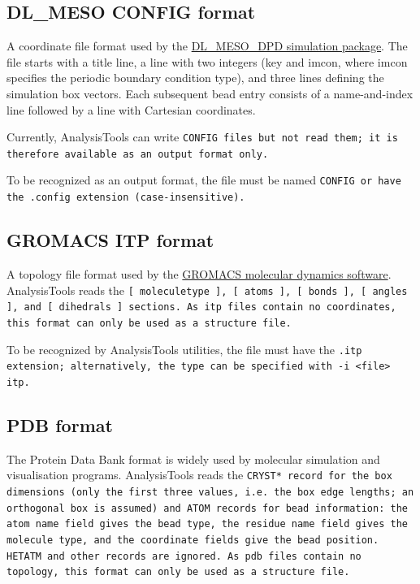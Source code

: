 \subsection{DL\_MESO CONFIG format}\label{ssec:StructConfig} %

A coordinate file format used by the
\href{https://www.scd.stfc.ac.uk/Pages/DL_MESO.aspx}{DL\_MESO\_DPD simulation
package}. The file starts with a title line, a line with two integers (key and
imcon, where imcon specifies the periodic boundary condition type), and three
lines defining the simulation box vectors. Each subsequent bead entry consists
of a name-and-index line followed by a line with Cartesian coordinates.

Currently, AnalysisTools can write \tt{CONFIG} files but not read them; it is
therefore available as an output format only.

To be recognized as an output format, the file must be named \tt{CONFIG} or
have the \tt{.config} extension (case-insensitive). %

\subsection{GROMACS ITP format}\label{ssec:StructItp} %

A topology file format used by the
\href{https://www.gromacs.org/}{GROMACS molecular dynamics software}.
AnalysisTools reads the \tt{[ moleculetype ]}, \tt{[ atoms ]}, \tt{[ bonds ]},
\tt{[ angles ]}, and \tt{[ dihedrals ]} sections. As \tt{itp} files contain no
coordinates, this format can only be used as a structure file.

To be recognized by AnalysisTools utilities, the file must have the \tt{.itp}
extension; alternatively, the type can be specified with \tt{-i <file> itp}. %

\subsection{PDB format}\label{ssec:StructPdb} %

The Protein Data Bank format is widely used by molecular simulation and
visualisation programs. AnalysisTools reads the \tt{CRYST*} record for the box
dimensions (only the first three values, i.e.\ the box edge lengths; an
orthogonal box is assumed) and \tt{ATOM} records for bead information: the atom
name field gives the bead type, the residue name field gives the molecule type,
and the coordinate fields give the bead position. \tt{HETATM} and other records
are ignored. As \tt{pdb} files contain no topology, this format can only be used
as a structure file.

